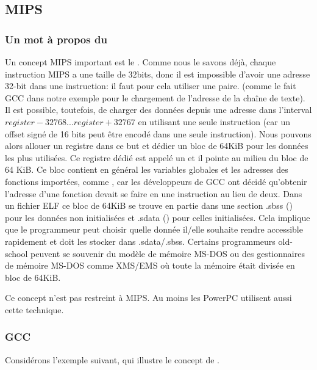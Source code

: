 \subsection{MIPS}

\subsubsection{Un mot à propos du }
\label{MIPS_GP}


Un concept MIPS important est le .
Comme nous le savons déjà, chaque instruction MIPS a une taille de 32bits, donc
il est impossible d'avoir une adresse 32-bit dans une instruction: il faut pour
cela utiliser une paire.
(comme le fait GCC dans notre exemple pour le chargement de l'adresse de la chaîne
de texte).
Il est possible, toutefois, de charger des données depuis une adresse dans l'interval
$register-32768...register+32767$ en utilisant une seule instruction (car un offset
signé de 16 bits peut être encodé dans une seule instruction).
Nous pouvons alors allouer un registre dans ce but et dédier un bloc de 64KiB
pour les données les plus utilisées.
Ce registre dédié est appelé un  et il pointe au milieu du
bloc de 64 KiB.
Ce bloc contient en général les variables globales et les adresses des fonctions
importées, comme \printf, car les développeurs de GCC ont décidé qu'obtenir
l'adresse d'une fonction devait se faire en une instruction au lieu de deux.
Dans un fichier ELF ce bloc de 64KiB se trouve en partie dans une section .sbss
() pour les données non initialisées et .sdata ()
pour celles initialisées.
Cela implique que le programmeur peut choisir quelle donnée il/elle souhaite rendre
accessible rapidement et doit les stocker dans .sdata/.sbss.
Certains programmeurs old-school peuvent se souvenir du modèle de mémoire MS-DOS
 ou des gestionnaires de mémoire MS-DOS comme XMS/EMS
où toute la mémoire était divisée en bloc de 64KiB.


Ce concept n'est pas restreint à MIPS. Au moins les PowerPC utilisent aussi cette
technique.

\subsubsection{GCC \Optimizing}

Considérons l'exemple suivant, qui illustre le concept de .

